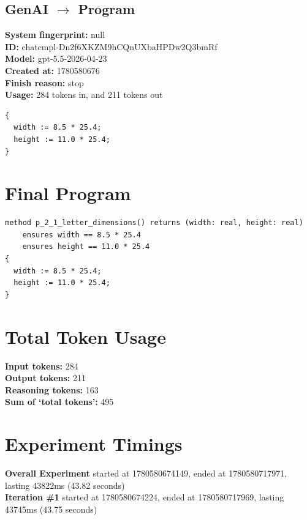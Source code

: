 \documentclass{article}
\begin{document}
\subsection*{GenAI $\rightarrow$ Program}
\textbf{System fingerprint: }null
\\\textbf{ID: }chatcmpl-Dn2f6XKZM9hCQnUXbaHPDw2Q3bmRf
\\\textbf{Model: }gpt-5.5-2026-04-23
\\\textbf{Created at: }1780580676
\\\textbf{Finish reason: }stop
\\\textbf{Usage: }284 tokens in, and 211 tokens out
\begin{lstlisting}
{
  width := 8.5 * 25.4;
  height := 11.0 * 25.4;
}
\end{lstlisting}
\section*{Final Program}
\begin{lstlisting}
method p_2_1_letter_dimensions() returns (width: real, height: real)
	ensures width == 8.5 * 25.4
	ensures height == 11.0 * 25.4
{
  width := 8.5 * 25.4;
  height := 11.0 * 25.4;
}
\end{lstlisting}
\section*{Total Token Usage}
\textbf{Input tokens: }284
\\\textbf{Output tokens: }211
\\\textbf{Reasoning tokens: }163
\\\textbf{Sum of `total tokens': }495
\section*{Experiment Timings}
\textbf{Overall Experiment} started at 1780580674149, ended at 1780580717971, lasting 43822ms (43.82 seconds)
\\\textbf{Iteration \#1} started at 1780580674224, ended at 1780580717969, lasting 43745ms (43.75 seconds)
\end{document}
